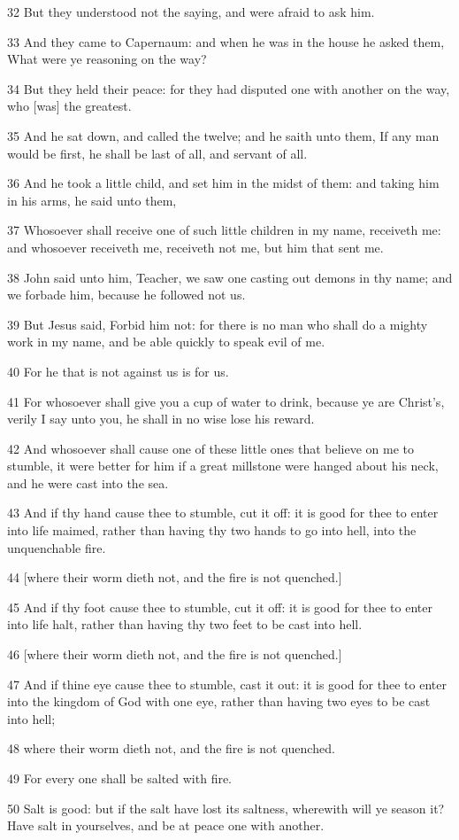 \par 32 But they understood not the saying, and were afraid to ask him.
\par 33 And they came to Capernaum: and when he was in the house he asked them, What were ye reasoning on the way?
\par 34 But they held their peace: for they had disputed one with another on the way, who [was] the greatest.
\par 35 And he sat down, and called the twelve; and he saith unto them, If any man would be first, he shall be last of all, and servant of all.
\par 36 And he took a little child, and set him in the midst of them: and taking him in his arms, he said unto them,
\par 37 Whosoever shall receive one of such little children in my name, receiveth me: and whosoever receiveth me, receiveth not me, but him that sent me.
\par 38 John said unto him, Teacher, we saw one casting out demons in thy name; and we forbade him, because he followed not us.
\par 39 But Jesus said, Forbid him not: for there is no man who shall do a mighty work in my name, and be able quickly to speak evil of me.
\par 40 For he that is not against us is for us.
\par 41 For whosoever shall give you a cup of water to drink, because ye are Christ's, verily I say unto you, he shall in no wise lose his reward.
\par 42 And whosoever shall cause one of these little ones that believe on me to stumble, it were better for him if a great millstone were hanged about his neck, and he were cast into the sea.
\par 43 And if thy hand cause thee to stumble, cut it off: it is good for thee to enter into life maimed, rather than having thy two hands to go into hell, into the unquenchable fire.
\par 44 [where their worm dieth not, and the fire is not quenched.]
\par 45 And if thy foot cause thee to stumble, cut it off: it is good for thee to enter into life halt, rather than having thy two feet to be cast into hell.
\par 46 [where their worm dieth not, and the fire is not quenched.]
\par 47 And if thine eye cause thee to stumble, cast it out: it is good for thee to enter into the kingdom of God with one eye, rather than having two eyes to be cast into hell;
\par 48 where their worm dieth not, and the fire is not quenched.
\par 49 For every one shall be salted with fire.
\par 50 Salt is good: but if the salt have lost its saltness, wherewith will ye season it? Have salt in yourselves, and be at peace one with another.

